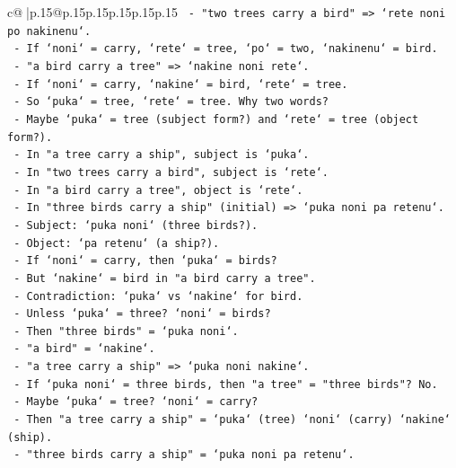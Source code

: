 \documentclass{article}
\begin{document}
{\begin{supertabular}{c@{$\;$}|p{.15\linewidth}@{}p{.15\linewidth}p{.15\linewidth}p{.15\linewidth}p{.15\linewidth}p{.15\linewidth}}
{{{\texttt{            {-} "two trees carry a bird" => `rete noni po nakinenu`.} \\
\texttt{              {-} If `noni` = carry, `rete` = tree, `po` = two, `nakinenu` = bird.} \\
\texttt{            {-} "a bird carry a tree" => `nakine noni rete`.} \\
\texttt{              {-} If `noni` = carry, `nakine` = bird, `rete` = tree.} \\
\texttt{            {-} So `puka` = tree, `rete` = tree. Why two words?} \\
\texttt{            {-} Maybe `puka` = tree (subject form?) and `rete` = tree (object form?).} \\
\texttt{            {-} In "a tree carry a ship", subject is `puka`.} \\
\texttt{            {-} In "two trees carry a bird", subject is `rete`.} \\
\texttt{            {-} In "a bird carry a tree", object is `rete`.} \\
\texttt{            {-} In "three birds carry a ship" (initial) => `puka noni pa retenu`.} \\
\texttt{              {-} Subject: `puka noni` (three birds?).} \\
\texttt{              {-} Object: `pa retenu` (a ship?).} \\
\texttt{              {-} If `noni` = carry, then `puka` = birds?} \\
\texttt{              {-} But `nakine` = bird in "a bird carry a tree".} \\
\texttt{              {-} Contradiction: `puka` vs `nakine` for bird.} \\
\texttt{              {-} Unless `puka` = three? `noni` = birds?} \\
\texttt{              {-} Then "three birds" = `puka noni`.} \\
\texttt{              {-} "a bird" = `nakine`.} \\
\texttt{              {-} "a tree carry a ship" => `puka noni nakine`.} \\
\texttt{                {-} If `puka noni` = three birds, then "a tree" = "three birds"? No.} \\
\texttt{              {-} Maybe `puka` = tree? `noni` = carry?} \\
\texttt{              {-} Then "a tree carry a ship" = `puka` (tree) `noni` (carry) `nakine` (ship).} \\
\texttt{              {-} "three birds carry a ship" = `puka noni pa retenu`.} \\
}}}
\end{supertabular}}
\end{document}
